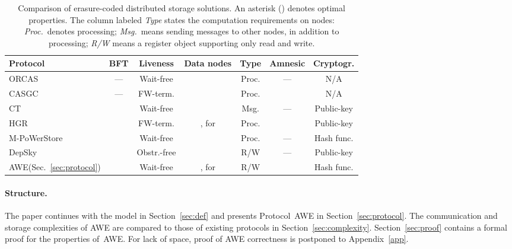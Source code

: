 \documentclass[oribibl]{llncs}
\theoremstyle{definition-boldhead}
\newcommand{\NAME}{AWE\xspace}
\newcommand{\nodes}{nodes\xspace}
\begin{document}
\begin{table}
  \centering
  \begin{tabular}{|l||c|c|c|c|c|c|}
    \hline
    {\bf Protocol} & {\bf BFT} & {\bf Liveness} & {\bf Data \nodes} &
      {\bf Type} & {\bf Amnesic} & {\bf Cryptogr.} \\ \hline
    ORCAS~\cite{dugule08} & --- & Wait-free &  & Proc. &
      ---  & N/A \\ \hline
    CASGC~\cite{clmm13}   & --- & FW-term.  &  & Proc. &
      \Y \T   & N/A \\ \hline
    CT~\cite{cactes06}    & \Y \T & Wait-free \T &  & Msg. &
      ---  & Public-key \\ \hline
    HGR~\cite{hegare07b}  & \Y \T & FW-term.  & , for  & Proc. &
      \Y \T & Public-key \\ \hline
    M-PoWerStore~\cite{dklmsv13}  & \Y \T & Wait-free \T &  & Proc. &
      ---  & Hash func. \T \\ \hline
    DepSky~\cite{bcqas11} & \Y \T & Obstr.-free  &  & R/W \T &
      ---  & Public-key \\ \hline
    \NAME (Sec.~\ref{sec:protocol})
                          & \Y \T & Wait-free \T & , for  \T &
      R/W \T & \Y \T & Hash func. \T \\ \hline
  \end{tabular}
  \caption{Comparison of erasure-coded distributed storage solutions.
    An asterisk (\T) denotes optimal properties. The column labeled
    \emph{Type} states the computation requirements on \nodes:
    \emph{Proc.}\ denotes processing;
\emph{Msg.}\ means sending messages to other
    \nodes, in addition to processing;
    \emph{R/W} means a register object supporting only read and write.}
  \label{tab:comparison}
\if\submit\yes
\vspace*{-4mm}
\fi
\end{table}


\paragraph{Structure.}

The paper continues with the model in Section~\ref{sec:def} and
presents Protocol~\NAME in Section~\ref{sec:protocol}.  The
communication and storage complexities of \NAME are compared
to those of existing protocols in Section~\ref{sec:complexity}.
\if\submit\no
Section~\ref{sec:proof} contains a formal proof for the properties
of~\NAME.
\else
For lack of space, proof of \NAME correctness is postponed to Appendix~\ref{app}.
\fi
\end{document}

